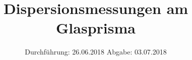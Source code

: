 

\subject{Versuch 402}
\title{Dispersionsmessungen am Glasprisma}
\date{%
  Durchführung: 26.06.2018
  \hspace{3em}
  Abgabe: 03.07.2018
}



\maketitle
\thispagestyle{empty}
\tableofcontents
\newpage






\printbibliography{}


